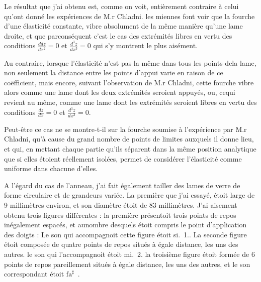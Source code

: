 \documentclass[11pt,a4paper]{article}
\begin{document}
Le résultat que j'ai obtenu est, comme on voit, entièrement
contraire à celui qu'ont donné les expériences de M.r Chladni.
les miennes font voir que la fourche d'une élasticité constante,
vibre absolument de la même manière qu'une lame droite,
et que parconséquent c'est le cas des extrémités libres
en vertu des conditions $\frac{ddz}{dx^2}=0$ et $\frac{d^3z}{dx^3}=0$ qui s'y
montrent le plus aisément.

Au contraire, lorsque l'élasticité n'est pas la même dans
tous les points dela lame, non seulement la distance
entre les points d'appui varie en raison de ce coëfficient,
mais encore, suivant l'observation de M.r Chladni,
cette fourche vibre alors comme une lame dont les deux
extrémités seroient appuyés, ou, cequi revient au même,
comme une lame dont les extrémités seroient libres
en vertu des conditions $\frac{dz}{dx}=0$ et $\frac{d^3z}{dx^3}=0$.



Peut-être ce cas ne se montre-t-il sur la fourche 
soumise à l'expérience par M.r Chladni, qu'à cause du grand nombre
de points de limites auxquels il donne lieu, et qui, en mettant
chaque partie qu'ils séparent dans la même position analytique
que si elles étoient réellement isolées, permet de considérer
l'élasticité comme uniforme dans chacune d'elles.

A l'égard du cas de l'anneau, j'ai fait également tailler
des lames de verre de forme circulaire et de grandeurs
variée. La première que j'ai essayé, étoit large de
9 millimètres environ, et son diamètre étoit de 83 millimètres.
J'ai aisement obtenu trois figures différentes : la première
présentoit trois points de repos inégalement espacés, et
aunombre desquels étoit compris le point d'application
des doigts : Le son qui accompagnoit cette figure
étoit si.~1.. La seconde figure étoit composée de quatre
points de repos situés à égale distance, les uns des autres.
le son qui l'accompagnoit étoit mi.~2. 
la troisième figure étoit formée de 6 points de repos
pareillement situés à égale distance, les uns des autres, et
le son correspondant étoit $\text{fa}^{\sharp}$~.
\end{document}
